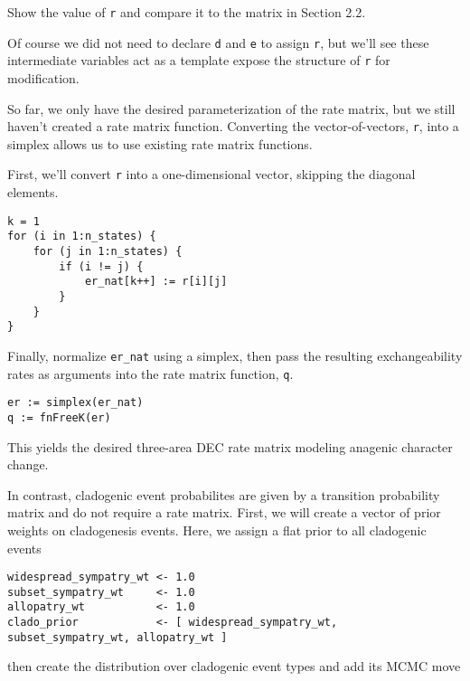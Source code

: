 Show the value of {\tt r} and compare it to the matrix in Section 2.2.

Of course we did not need to declare {\tt d} and {\tt e} to assign {\tt r}, but we'll see these intermediate variables act as a template expose the structure of {\tt r} for modification.

So far, we only have the desired parameterization of the rate matrix, but we still haven't created a rate matrix function. Converting the vector-of-vectors, {\tt r}, into a simplex allows us to use existing rate matrix functions. 

First, we'll convert {\tt r} into a one-dimensional vector, skipping the diagonal elements.

\begin{snugshade}
\begin{lstlisting}
k = 1
for (i in 1:n_states) {
    for (j in 1:n_states) {
        if (i != j) {
            er_nat[k++] := r[i][j]
        }
    }
}
\end{lstlisting}
\end{snugshade}

Finally, normalize {\tt er\_nat} using a simplex, then pass the resulting exchangeability rates as arguments into the rate matrix function, {\tt q}.

\begin{snugshade}
\begin{lstlisting}
er := simplex(er_nat)
q := fnFreeK(er)
\end{lstlisting}
\end{snugshade}

This yields the desired three-area DEC rate matrix modeling anagenic character change.


In contrast, cladogenic event probabilites are given by a transition probability matrix and do not require a rate matrix.
First, we will create a vector of prior weights on cladogenesis events. Here, we assign a flat prior to all cladogenic events

\begin{snugshade}
\begin{lstlisting}
widespread_sympatry_wt <- 1.0
subset_sympatry_wt     <- 1.0
allopatry_wt           <- 1.0
clado_prior            <- [ widespread_sympatry_wt, subset_sympatry_wt, allopatry_wt ]
\end{lstlisting}
\end{snugshade}

then create the distribution over cladogenic event types and add its MCMC move

